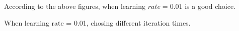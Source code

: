 \documentclass{article}
\begin{document}
\begin{itemize}
According to the above figures, when learning $rate = 0.01$ is a good choice.\\
\pagebreak

When learning rate = 0.01, chosing different iteration times.\\
\begin{figure}[htbp]
    \centering
    

\end{figure}
\end{itemize}
\end{document}
